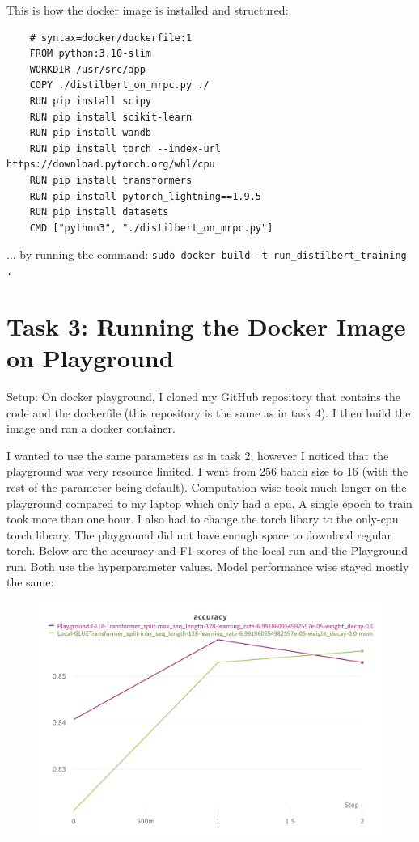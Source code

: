 \documentclass{article}
\begin{document}
This is how the docker image is installed and structured:

\begin{lstlisting}
    # syntax=docker/dockerfile:1
    FROM python:3.10-slim
    WORKDIR /usr/src/app
    COPY ./distilbert_on_mrpc.py ./ 
    RUN pip install scipy
    RUN pip install scikit-learn
    RUN pip install wandb
    RUN pip install torch --index-url https://download.pytorch.org/whl/cpu
    RUN pip install transformers 
    RUN pip install pytorch_lightning==1.9.5 
    RUN pip install datasets
    CMD ["python3", "./distilbert_on_mrpc.py"]
    \end{lstlisting}
... by running the command: 
\verb!sudo docker build -t run_distilbert_training .!

\section{Task 3: Running the Docker Image on Playground}
Setup: On docker playground, I cloned my GitHub repository that contains the code and the dockerfile (this repository is the same as in task 4). 
I then build the image and ran a docker container. 

I wanted to use the same parameters as in task 2, 
however I noticed that the playground was very resource limited. I went from 256 batch size to 16 (with the rest of the parameter being default).
Computation wise took much longer on the playground compared to my laptop which only had a cpu. A single epoch to train took more than one hour. 
I also had to change the torch libary to the only-cpu torch library. The playground did not have enough space to download regular torch. 
Below are the accuracy and F1 scores of the local run and the Playground run. Both use the hyperparameter values. Model performance wise stayed mostly the same:


\begin{figure}[h]
    \centering
        \includegraphics[width=0.66\linewidth]{Accuracy}\hfil
    \end{figure}
\end{document}
